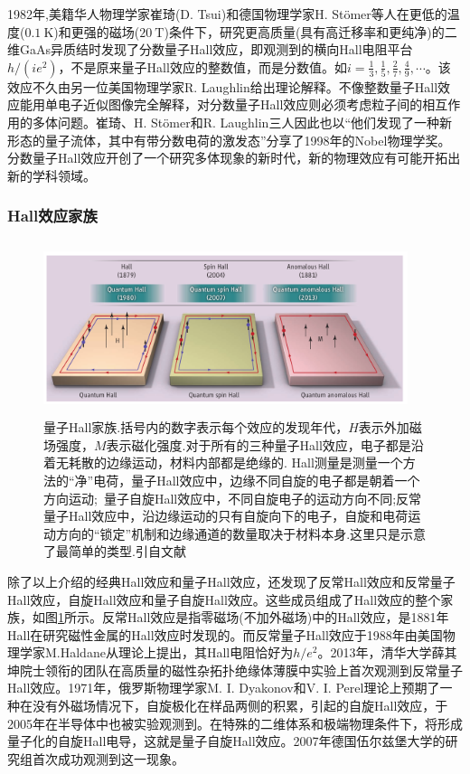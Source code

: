 1982年,美籍华人物理学家崔琦(D. Tsui)和德国物理学家H. St\"omer等人在更低的温度($0.1~\mathrm{K}$)和更强的磁场($20~\mathrm{T}$)条件下，研究更高质量(具有高迁移率和更纯净)的二维GaAs异质结时发现了分数量子Hall效应，即观测到的横向Hall电阻平台$h/(ie^2)$，不是原来量子Hall效应的整数值，而是分数值。如$i=\frac13,\frac15,\frac27,\frac49,\cdots$。该效应不久由另一位美国物理学家R. Laughlin给出理论解释。不像整数量子Hall效应能用单电子近似图像完全解释，对分数量子Hall效应则必须考虑粒子间的相互作用的多体问题。崔琦、H. St\"omer和R. Laughlin三人因此也以``他们发现了一种新形态的量子流体，其中有带分数电荷的激发态''分享了1998年的Nobel物理学奖。分数量子Hall效应开创了一个研究多体现象的新时代，新的物理效应有可能开拓出新的学科领域。

\subsubsection{Hall效应家族} 
\begin{figure}[h!]
\centering
\vspace*{-0.10in}
\includegraphics[height=2.00in,width=4.20in,viewport=0 0 1368 576,clip]{Figures/Hall-Family_Science.png}
\caption{\small \textrm{量子Hall家族.括号内的数字表示每个效应的发现年代，$H$表示外加磁场强度，$M$表示磁化强度.对于所有的三种量子Hall效应，电子都是沿着无耗散的边缘运动，材料内部都是绝缘的. Hall测量是测量一个方法的``净''电荷，量子Hall效应中，边缘不同自旋的电子都是朝着一个方向运动;~量子自旋Hall效应中，不同自旋电子的运动方向不同;反常量子Hall效应中，沿边缘运动的只有自旋向下的电子，自旋和电荷运动方向的``锁定''机制和边缘通道的数量取决于材料本身.这里只是示意了最简单的类型.引自文献}}%
\label{Fig:Hall-Family}
\end{figure} 
除了以上介绍的经典Hall效应和量子Hall效应，还发现了反常Hall效应和反常量子Hall效应，自旋Hall效应和量子自旋Hall效应。这些成员组成了Hall效应的整个家族，如图\ref{Fig:Hall-Family}所示。反常Hall效应是指零磁场(不加外磁场)中的Hall效应，是1881年Hall在研究磁性金属的Hall效应时发现的。而反常量子Hall效应于1988年由美国物理学家M.Haldane从理论上提出，其Hall电阻恰好为$h/e^2$。2013年，清华大学薛其坤院士领衔的团队在高质量的磁性杂拓扑绝缘体薄膜中实验上首次观测到反常量子Hall效应。1971年，俄罗斯物理学家M. I. Dyakonov和V. I. Perel理论上预期了一种在没有外磁场情况下，自旋极化在样品两侧的积累，引起的自旋Hall效应，于2005年在半导体中也被实验观测到。在特殊的二维体系和极端物理条件下，将形成量子化的自旋Hall电导，这就是量子自旋Hall效应。2007年德国伍尔兹堡大学的研究组首次成功观测到这一现象。

